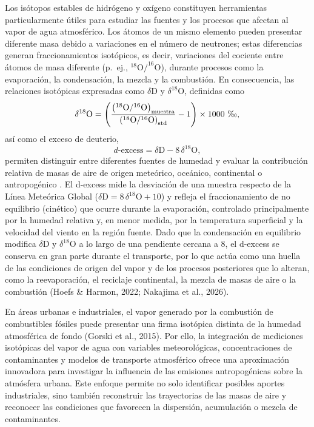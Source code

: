 Los isótopos estables de hidrógeno y oxígeno constituyen herramientas
particularmente útiles para estudiar las fuentes y los procesos que afectan
al vapor de agua atmosférico. Los átomos de un mismo elemento pueden
presentar diferente masa debido a variaciones en el número de neutrones;
estas diferencias generan fraccionamientos isotópicos, es decir, variaciones
del cociente entre átomos de masa diferente (p.~ej., $^{18}\mathrm{O}/^{16}\mathrm{O}$),
durante procesos como la evaporación, la condensación, la mezcla y la
combustión. En consecuencia, las relaciones isotópicas expresadas como
$\delta\mathrm{D}$ y $\delta^{18}\mathrm{O}$, definidas como
\begin{equation}
  \delta^{18}\mathrm{O} =
  \left(
    \frac{\left(^{18}\mathrm{O}/^{16}\mathrm{O}\right)_{\mathrm{muestra}}}
         {\left(^{18}\mathrm{O}/^{16}\mathrm{O}\right)_{\mathrm{std}}} - 1
  \right) \times 1000 \ \text{\textperthousand},
  \label{eq:delta18O}
\end{equation}
así como el exceso de deuterio,
\begin{equation}
  d\text{-excess} = \delta\mathrm{D} - 8\,\delta^{18}\mathrm{O},
  \label{eq:dexcess}
\end{equation}
permiten distinguir entre diferentes fuentes de humedad y evaluar la
contribución relativa de masas de aire de origen meteórico, oceánico,
continental o antropogénico . El
d-excess mide la desviación de una muestra respecto de la Línea Meteórica
Global ($\delta\mathrm{D} = 8\,\delta^{18}\mathrm{O} + 10$) y refleja el
fraccionamiento de no equilibrio (cinético) que ocurre durante la
evaporación, controlado principalmente por la humedad relativa y, en menor
medida, por la temperatura superficial y la velocidad del viento en la
región fuente. Dado que la condensación en equilibrio modifica
$\delta\mathrm{D}$ y $\delta^{18}\mathrm{O}$ a lo largo de una pendiente
cercana a 8, el d-excess se conserva en gran parte durante el transporte, por
lo que actúa como una huella de las condiciones de origen del vapor y de los
procesos posteriores que lo alteran, como la reevaporación, el reciclaje
continental, la mezcla de masas de aire o la combustión (Hoefs \& Harmon, 2022; Nakajima et al., 2026). 

En áreas urbanas e industriales, el vapor generado por la combustión de combustibles 
fósiles puede presentar una firma isotópica distinta de la humedad atmosférica de 
fondo (Gorski et al., 2015). 
Por ello, la integración de mediciones isotópicas del vapor de agua con variables meteorológicas, 
concentraciones de contaminantes y modelos de transporte atmosférico ofrece una aproximación 
innovadora para investigar la influencia de las emisiones antropogénicas sobre la atmósfera 
urbana. Este enfoque permite no solo identificar posibles aportes industriales, sino también 
reconstruir las trayectorias de las masas de aire y reconocer las condiciones que favorecen 
la dispersión, acumulación o mezcla de contaminantes.

